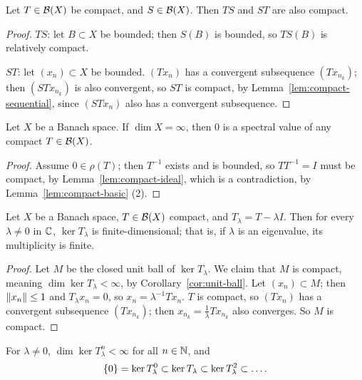\begin{lemma}\label{lem:compact-ideal}
Let $T \in \mathcal{B}(X)$ be compact, and $S \in \mathcal{B}(X)$. Then $TS$ and $ST$
are also compact.
\end{lemma}

\begin{proof}
$TS$: let $B \subset X$ be bounded; then $S(B)$ is bounded, so $TS(B)$ is
relatively compact.

$ST$: let $(x_n) \subset X$ be bounded. $(Tx_n)$ has a convergent subsequence
$(Tx_{n_k})$; then $(STx_{n_k})$ is also convergent, so $ST$ is compact, by
Lemma~\ref{lem:compact-sequential}, since $(STx_n)$ also has a convergent
subsequence.
\end{proof}

\begin{corollary}\label{cor:compact-zero-spectrum}
Let $X$ be a Banach space. If $\dim X = \infty$, then $0$ is a spectral value
of any compact $T \in \mathcal{B}(X)$.
\end{corollary}

\begin{proof}
Assume $0 \in \rho(T)$; then $T^{-1}$ exists and is bounded, so
$T T^{-1} = I$ must be compact, by Lemma~\ref{lem:compact-ideal}, which is a
contradiction, by Lemma~\ref{lem:compact-basic} (2).
\end{proof}

\begin{proposition}\label{prop:compact-kernel}
Let $X$ be a Banach space, $T \in \mathcal{B}(X)$ compact, and
$T_\lambda = T - \lambda I$. Then for every $\lambda \ne 0$ in $\mathbb{C}$,
$\ker T_\lambda$ is finite-dimensional; that is, if $\lambda$ is an
eigenvalue, its multiplicity is finite.
\end{proposition}

\begin{proof}
Let $M$ be the closed unit ball of $\ker T_\lambda$. We claim that $M$ is
compact, meaning $\dim \ker T_\lambda < \infty$, by
Corollary~\ref{cor:unit-ball}. Let $(x_n) \subset M$; then
$\lVert x_n\rVert \le 1$ and $T_\lambda x_n = 0$, so $x_n = \lambda^{-1} T x_n$.
$T$ is compact, so $(Tx_n)$ has a convergent subsequence $(Tx_{n_k})$; then
$x_{n_k} = \frac{1}{\lambda} T x_{n_k}$ also converges. So $M$ is compact.
\end{proof}

\begin{corollary}\label{cor:compact-kernel-powers}
For $\lambda \ne 0$, $\dim \ker T_\lambda^n < \infty$ for all $n \in \mathbb{N}$,
and
\[
  \{0\} = \ker T_\lambda^0 \subset \ker T_\lambda \subset
  \ker T_\lambda^2 \subset \dots .
\]
\end{corollary}

